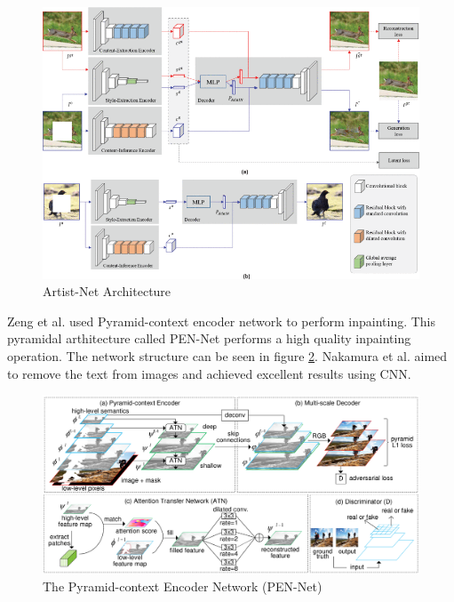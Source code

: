 \begin{figure}[h!]
    \centering
    \includegraphics[width=14cm]{figures/chapter4/artist.png}
    \vspace*{4mm}
    \caption{Artist-Net Architecture \cite{artistNet}}
    \label{fig:artistNet}
\end{figure}

Zeng et al. \cite{pyramid_network} used Pyramid-context encoder network to perform inpainting. This pyramidal arthitecture called PEN-Net performs a high quality inpainting operation. The network structure can be seen in figure \ref{fig:pennet}. Nakamura et al. \cite{nakamura} aimed to remove the text from images and achieved excellent results using CNN. 

\begin{figure}[h!]
    \centering
    \includegraphics[width=14cm]{figures/chapter4/pyramid.png}
    \vspace*{5mm}
    \caption{The Pyramid-context Encoder Network (PEN-Net) \cite{pyramid_network}}
    \label{fig:pennet}
\end{figure}

